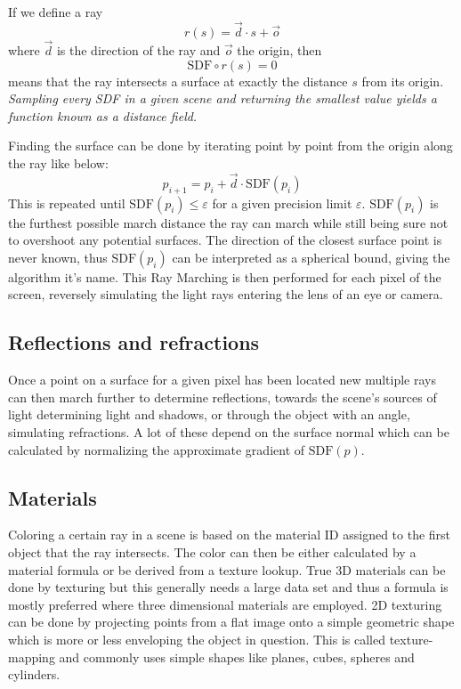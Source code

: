 		If we define a ray $$r(s) = \vec{d} \cdot s + \vec{o}$$
		where $\vec{d}$ is the direction of the ray and $\vec{o}$ the origin, then
		$$\text{SDF}\circ r(s) = 0$$ means that the ray intersects a surface at
		exactly the distance $s$ from its origin.  \emph{ Sampling every SDF in a
		given scene and returning the smallest value yields a function known as a
		distance field.  }

		\bigskip
		\noindent Finding the surface can be done by iterating point by point from the
		origin along the ray like below: $$p_{i+1} = p_i + \vec{d}\cdot
		\text{SDF}(p_i)$$ This is repeated until $\text{SDF}(p_i) \leq
		\varepsilon$ for a given precision limit $\varepsilon$.
		$\text{SDF}(p_i)$ is the furthest possible march distance the ray can 
		march while still being sure not to overshoot any potential surfaces.  
		The direction of the closest surface point is never known, thus 
		$\text{SDF}(p_i)$ can be interpreted as a spherical bound, giving the 
		algorithm it's name. This Ray Marching is then performed for each pixel 
		of the screen, reversely simulating the light rays entering the lens of 
		an eye or camera.
			
			\subsection{Reflections and refractions}
		
				Once a point on a surface for a given pixel has been located
				new multiple rays can then march further to determine
				reflections, towards the scene's sources of light determining
				light and shadows, or through the object with an angle,
				simulating refractions. A lot of these depend on the surface
				normal which can be calculated by normalizing the approximate
				gradient of $\text{SDF}(p)$. 
		
			\subsection{Materials}
				Coloring a certain ray in a scene is based on the material ID
				assigned to the first object that the ray intersects. The color
				can then be either calculated by a material formula or be 
				derived from a texture lookup. True 3D materials can be done by
				texturing but this generally needs a large data set and thus a 
				formula is mostly preferred where three dimensional materials 
				are employed. 2D texturing can be done by projecting points from
				a flat image onto a simple geometric shape  which is more or less 
				enveloping the object in question. This is called texture-mapping 
				and commonly uses simple shapes like planes, cubes, spheres and 
				cylinders. 
				
